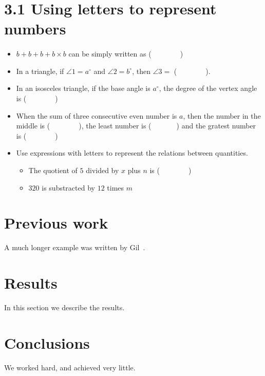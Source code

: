 \documentclass[12pt]{article}
\begin{document}
\maketitle

\section{3.1 Using letters to represent numbers}

\paragraph{}
\begin{itemize}
    \item $b+b+b+b\times b$ can be simply written as (~~~~~~~~)
    \item In a triangle, if $\angle 1=a^{\circ}$ and $\angle 2=b^{\circ}$, then $\angle 3=$ (~~~~~~~~).
    \item In an isosceles triangle, if the base angle is $a^{\circ}$, the degree of the vertex angle is (~~~~~~~~)    
    \item When the sum of three consecutive even number is $a$, then the number in the middle is (~~~~~~~~), the least number is (~~~~~~~) and the gratest number is (~~~~~~~~)
    \item Use expressions with letters to represent the relations between quantities.
    \begin{itemize}
        \item The quotient of $5$ divided by $x$ plus $n$ is (~~~~~~~~)
        \item $320$ is substracted by $12$ times $m$
    \end{itemize}
\end{itemize}

\section{Previous work}\label{previous work}
A much longer \LaTeXe{} example was written by Gil~\cite{Gil:02}.

\section{Results}\label{results}
In this section we describe the results.

\section{Conclusions}\label{conclusions}
We worked hard, and achieved very little.



\end{document}

